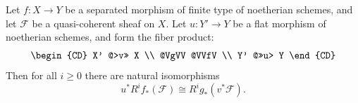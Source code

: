 Let $f: X \to Y$ be a separated morphism of finite type of noetherian schemes, and let $\mathcal{F}$ be a quasi-coherent sheaf on $X$. Let $u: Y' \to Y$ be a flat morphism of noetherian schemes, and form the fiber product:
$$\begin{CD}
X' @>v>> X \\
@VgVV @VVfV \\
Y' @>>u> Y
\end{CD}$$
Then for all $i \geqslant 0$ there are natural isomorphisms
$$u^* R^i f_*(\mathcal{F}) \cong R^i g_*(v^* \mathcal{F}).$$
